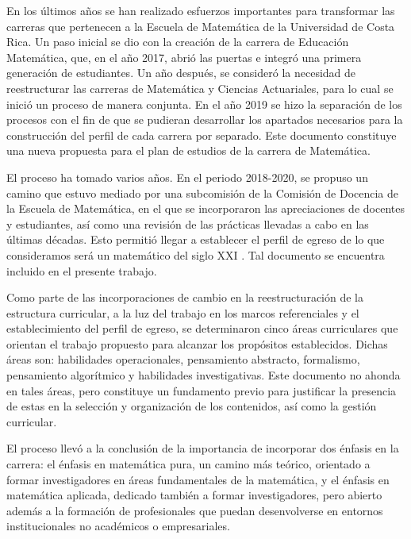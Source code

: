 ﻿

En los últimos años se han realizado esfuerzos importantes para transformar las carreras que pertenecen a la Escuela de Matemática de la Universidad de Costa Rica. Un paso inicial se dio con la creación de la carrera de Educación Matemática, que, en el año 2017, abrió las puertas e integró una primera generación de estudiantes. Un año después, se consideró la necesidad de reestructurar las carreras de Matemática y Ciencias Actuariales, para lo cual se inició un proceso de manera conjunta. En el año 2019 se hizo la separación de los procesos con el fin de que se pudieran desarrollar los apartados necesarios para la construcción del perfil de cada carrera por separado. Este documento constituye una nueva propuesta para el plan de estudios de la carrera de Matemática.

El proceso ha tomado varios años. En el periodo 2018-2020, se propuso un camino que estuvo mediado por una subcomisión de la Comisión de Docencia de la Escuela de Matemática, en el que se incorporaron las apreciaciones de docentes y estudiantes, así como una revisión de las prácticas llevadas a cabo en las últimas décadas. Esto permitió llegar a establecer el perfil de egreso de lo que consideramos será un matemático del siglo XXI . Tal documento se encuentra incluido en el presente trabajo.

Como parte de las incorporaciones de cambio en la reestructuración de la estructura curricular, a la luz del trabajo en los marcos referenciales y el establecimiento del perfil de egreso, se determinaron cinco áreas curriculares que orientan el trabajo propuesto para alcanzar los propósitos establecidos. Dichas áreas son: habilidades operacionales, pensamiento abstracto, formalismo, pensamiento algorítmico y habilidades investigativas. Este documento no ahonda en tales áreas, pero constituye un fundamento previo para justificar la presencia de estas en la selección y organización de los contenidos, así como la gestión curricular. 

El proceso llevó a la conclusión de la importancia de incorporar dos énfasis en la carrera: el énfasis en matemática pura, un camino más teórico, orientado a formar investigadores en áreas fundamentales de la matemática, y el énfasis en matemática aplicada, dedicado también a formar investigadores, pero abierto además a la formación de profesionales que puedan desenvolverse en entornos institucionales no académicos o empresariales.


